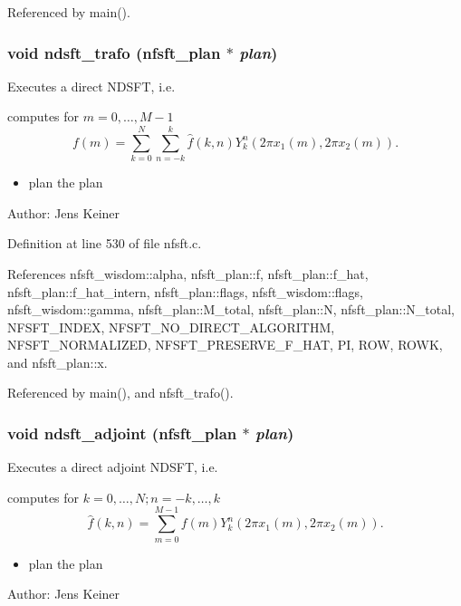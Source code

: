Referenced by main().\hypertarget{group__nfsft_gc1bcdf551a0bf1b4a5890b87e583caf8}{
\subsubsection{\setlength{\rightskip}{0pt plus 5cm}void ndsft\_\-trafo ({\bf nfsft\_\-plan} $\ast$ {\em plan})}}
\label{group__nfsft_gc1bcdf551a0bf1b4a5890b87e583caf8}


Executes a direct NDSFT, i.e. 

computes for $m = 0,\ldots,M-1$ \[ f(m) = \sum_{k=0}^N \sum_{n=-k}^k \hat{f}(k,n) Y_k^n\left(2\pi x_1(m), 2\pi x_2(m)\right). \]

\begin{itemize}
\item plan the plan\end{itemize}
\begin{Desc}
\item[Author:]Jens Keiner \end{Desc}


Definition at line 530 of file nfsft.c.

References nfsft\_\-wisdom::alpha, nfsft\_\-plan::f, nfsft\_\-plan::f\_\-hat, nfsft\_\-plan::f\_\-hat\_\-intern, nfsft\_\-plan::flags, nfsft\_\-wisdom::flags, nfsft\_\-wisdom::gamma, nfsft\_\-plan::M\_\-total, nfsft\_\-plan::N, nfsft\_\-plan::N\_\-total, NFSFT\_\-INDEX, NFSFT\_\-NO\_\-DIRECT\_\-ALGORITHM, NFSFT\_\-NORMALIZED, NFSFT\_\-PRESERVE\_\-F\_\-HAT, PI, ROW, ROWK, and nfsft\_\-plan::x.

Referenced by main(), and nfsft\_\-trafo().\hypertarget{group__nfsft_g88c7be3ead1c726a1d5b8b903952c527}{
\subsubsection{\setlength{\rightskip}{0pt plus 5cm}void ndsft\_\-adjoint ({\bf nfsft\_\-plan} $\ast$ {\em plan})}}
\label{group__nfsft_g88c7be3ead1c726a1d5b8b903952c527}


Executes a direct adjoint NDSFT, i.e. 

computes for $k=0,\ldots,N; n=-k,\ldots,k$ \[ \hat{f}(k,n) = \sum_{m = 0}^{M-1} f(m) Y_k^n\left(2\pi x_1(m), 2\pi x_2(m)\right). \]

\begin{itemize}
\item plan the plan\end{itemize}
\begin{Desc}
\item[Author:]Jens Keiner \end{Desc}


